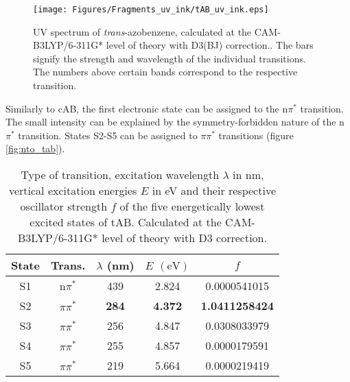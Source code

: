 \vspace{1 cm}
%
%
%
\begin{figure}[H]
    \centering
    \texttt{[image: Figures/Fragments\_uv\_ink/tAB\_uv\_ink.eps]}
    \caption{UV spectrum of \textit{trans}-azobenzene, calculated at the CAM-B3LYP/6-311G* level of theory with D3(BJ) correction.. The bars signify the strength and wavelength of the individual transitions. The numbers above certain bands correspond to the respective transition.}
    \label{fig:uv_fig_tAB}
\end{figure}
%
%
%
Similarly to cAB, the first electronic state can be assigned to the n$\pi^*$ transition. The small intensity can be explained by the symmetry-forbidden nature of the n$\pi^*$ transition. States S2-S5 can be assigned to $\pi\pi^*$ transitions (figure \ref{fig:nto_tab}).
%
%
%
\begin{table}[H]
\caption{Type of transition, excitation wavelength $\lambda$ in nm, vertical excitation energies $E$ in eV and their respective oscillator strength $f$ of the five energetically lowest excited states of tAB. Calculated at the CAM-B3LYP/6-311G* level of theory with D3 correction.}
\label{tab:excited_states_tAB}
\vspace{0.1 cm}
\centering
\begin{tabular}{ccccc}
\toprule
State & Trans. & $\lambda$ (nm)     & $E$ $\left(\si{\eV}\right)$          & $f$    \\
\midrule
S1    & n$\pi^*$	& 439             & 2.824                  & 0.0000541015          \\
S2    & $\pi\pi^*$ 	&\textbf{284}	  & \textbf{4.372}         & \textbf{1.0411258424} \\
S3    & $\pi\pi^*$	& 256             & 4.847                  & 0.0308033979          \\
S4    & $\pi\pi^*$	& 255             & 4.857                  & 0.0000179591          \\
S5    & $\pi\pi^*$	& 219             & 5.664                  & 0.0000219419         \\
\bottomrule
\end{tabular}
\end{table}
%
%
%
